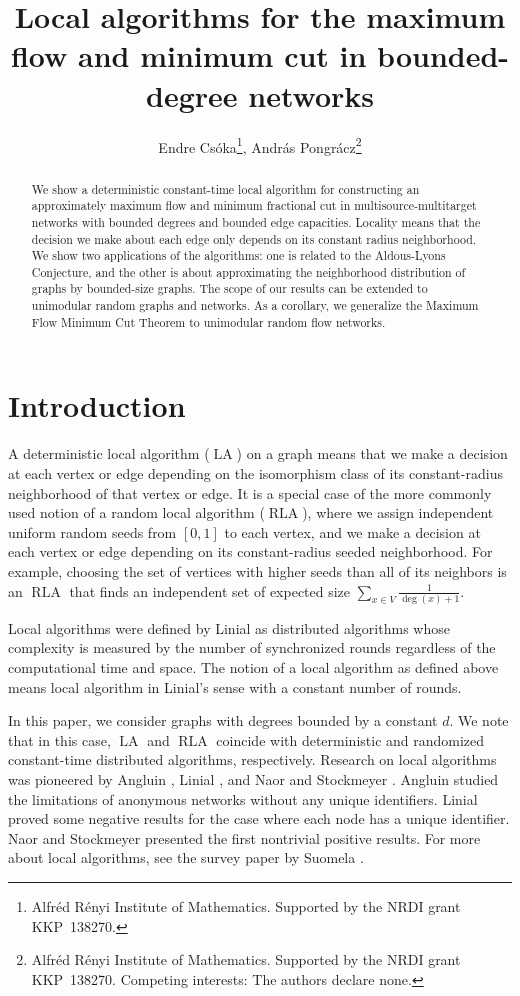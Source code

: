 \documentclass[12pt,a4paper]{article}
\title{Local algorithms for the maximum flow and minimum cut in bounded-degree networks}
\author{Endre Cs\'oka\thanks{Alfr\'ed R\'enyi Institute of Mathematics. Supported by the NRDI grant KKP~138270.}, Andr\'as Pongr\'acz\thanks{Alfr\'ed R\'enyi Institute of Mathematics. Supported by the NRDI grant KKP~138270. \newline
Competing interests: The authors declare none.}}
\date{}
\renewcommand{\:}{\colon}
\DeclareMathOperator{\LA}{LA}
\DeclareMathOperator{\RLA}{RLA}
\begin{document}
\maketitle

\begin{abstract}

We show a deterministic constant-time local algorithm for constructing an approximately maximum flow and minimum fractional cut in multisource-multitarget networks with bounded degrees and bounded edge capacities. 
Locality means that the decision we make about each edge only depends on its constant radius neighborhood. 
We show two applications of the algorithms: one is related to the Aldous-Lyons Conjecture, and the other is about approximating the neighborhood distribution of graphs by bounded-size graphs. 
The scope of our results can be extended to unimodular random graphs and networks. 
As a corollary, we generalize the Maximum Flow Minimum Cut Theorem to unimodular random flow networks. 

\end{abstract}

\section{Introduction}

A deterministic local algorithm ($\LA$) on a graph means that we make a decision at each vertex or edge depending on the isomorphism class of its constant-radius neighborhood of that vertex or edge. 
It is a special case of the more commonly used notion of a random local algorithm ($\RLA$), where we assign independent uniform random seeds from $[0, 1]$ to each vertex, and we make a decision at each vertex or edge depending on its constant-radius seeded neighborhood. 
For example, choosing the set of vertices with higher seeds than all of its neighbors is an $\RLA$ that finds an independent set of expected size $\sum\limits_{x \in V} \frac{1}{\deg(x) + 1}$. 

Local algorithms were defined by Linial \cite{Linial} as distributed algorithms whose complexity is measured by the number of synchronized rounds regardless of the computational time and space. 
The notion of a local algorithm as defined above means local algorithm in Linial's sense with a constant number of rounds. 

In this paper, we consider graphs with degrees bounded by a constant $d$. 
We note that in this case, $\LA$ and $\RLA$ coincide with deterministic and randomized constant-time distributed algorithms, respectively. 
Research on local algorithms was pioneered by Angluin \cite{Angluin}, Linial \cite{Linial}, and Naor and Stockmeyer \cite{NaSt}. 
Angluin \cite{Angluin} studied the limitations of anonymous networks without any unique identifiers. 
Linial \cite{Linial} proved some negative results for the case where each node has a unique identifier. 
Naor and Stockmeyer \cite{NaSt} presented the first nontrivial positive results. 
For more about local algorithms, see the survey paper by Suomela \cite{Suomela}.
\end{document}
